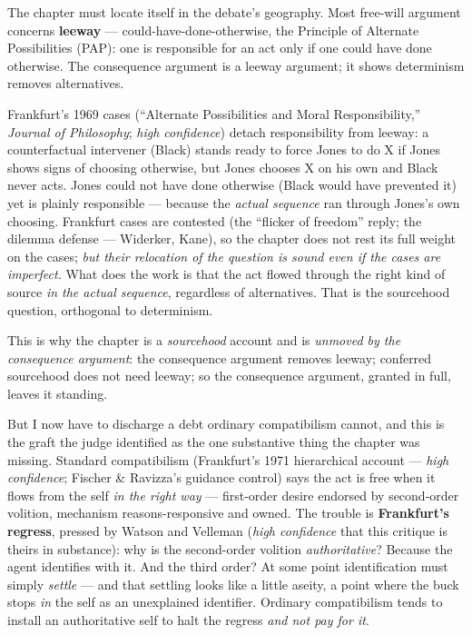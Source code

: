 \documentclass[11pt]{article}
\begin{document}
The chapter must locate itself in the debate's geography. Most free-will argument concerns \textbf{leeway} — could-have-done-otherwise, the Principle of Alternate Possibilities (PAP): one is responsible for an act only if one could have done otherwise. The consequence argument is a leeway argument; it shows determinism removes alternatives.

Frankfurt's 1969 cases (``Alternate Possibilities and Moral Responsibility,'' \emph{Journal of Philosophy}; \emph{high confidence}) detach responsibility from leeway: a counterfactual intervener (Black) stands ready to force Jones to do X if Jones shows signs of choosing otherwise, but Jones chooses X on his own and Black never acts. Jones could not have done otherwise (Black would have prevented it) yet is plainly responsible — because the \emph{actual sequence} ran through Jones's own choosing. Frankfurt cases are contested (the ``flicker of freedom'' reply; the dilemma defense — Widerker, Kane), so the chapter does not rest its full weight on the cases; \emph{but their relocation of the question is sound even if the cases are imperfect.} What does the work is that the act flowed through the right kind of source \emph{in the actual sequence}, regardless of alternatives. That is the sourcehood question, orthogonal to determinism.

This is why the chapter is a \emph{sourcehood} account and is \emph{unmoved by the consequence argument}: the consequence argument removes leeway; conferred sourcehood does not need leeway; so the consequence argument, granted in full, leaves it standing.

But I now have to discharge a debt ordinary compatibilism cannot, and this is the graft the judge identified as the one substantive thing the chapter was missing. Standard compatibilism (Frankfurt's 1971 hierarchical account — \emph{high confidence}; Fischer \& Ravizza's guidance control) says the act is free when it flows from the self \emph{in the right way} — first-order desire endorsed by second-order volition, mechanism reasons-responsive and owned. The trouble is \textbf{Frankfurt's regress}, pressed by Watson and Velleman (\emph{high confidence} that this critique is theirs in substance): why is the second-order volition \emph{authoritative}? Because the agent identifies with it. And the third order? At some point identification must simply \emph{settle} — and that settling looks like a little aseity, a point where the buck stops \emph{in} the self as an unexplained identifier. Ordinary compatibilism tends to install an authoritative self to halt the regress \emph{and not pay for it}.
\end{document}
